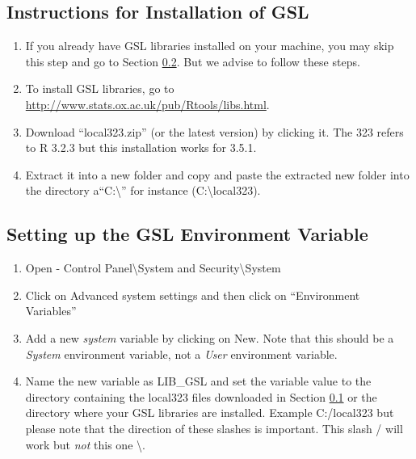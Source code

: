 \documentclass{article}
\begin{document}
\subsection{\Large Instructions for Installation of GSL}
\label{sec:gsl}
\begin{enumerate}
\item If you already have GSL libraries installed on your machine, you may skip this step and go to Section \ref{sec:libgsl}. But we advise to follow these steps. 
\item To install GSL libraries, go to \href{http://www.stats.ox.ac.uk/pub/Rtools/libs.html}{http://www.stats.ox.ac.uk/pub/Rtools/libs.html}.
\item Download ``local323.zip'' (or the latest version) by clicking it.  The 323 refers to R 3.2.3 but this installation works for 3.5.1.
\item Extract it into a new folder and copy and paste the extracted new folder into the  directory a``C:\textbackslash'' for instance (C:\textbackslash local323). 
\end{enumerate}



\subsection{\Large Setting up the GSL Environment Variable}
\label{sec:libgsl}
\begin{enumerate}
 \item Open - Control Panel\textbackslash System and Security\textbackslash System
 \item Click on Advanced system settings and then click on ``Environment Variables''
 \item Add a new {\em system} variable by clicking on New.  Note that this should be a {\em System} environment variable, not a {\em User} environment variable.
 \item Name the new variable as LIB\_GSL and set the variable value to the 
 directory containing the local323 files downloaded in Section \ref{sec:gsl} or the directory where your GSL libraries are installed. Example {C:/local323} but please note that the direction of these slashes is important. This slash / will work but {\em not} this one \textbackslash.
\end{enumerate}
\end{document}
